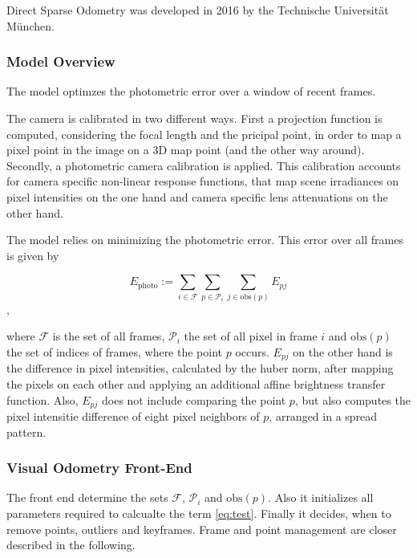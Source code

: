 	Direct Sparse Odometry was developed in 2016 by the Technische Universität München. %
	
	\subsubsection{Model Overview}\label{samemodel}
	
	The model optimzes the photometric error over a window of recent frames. 
	
	The camera is calibrated in two different ways. First a projection function is computed, considering the focal length and the pricipal point, 
	in order to map a pixel point in the image on a 3D map point (and the other way around). Secondly, a photometric camera calibration is applied. 
	This calibration accounts for camera specific non-linear response functions, that map scene irradiances on pixel intensities on the one hand and 
	camera specific lens attenuations on the other hand. 
	
	The model relies on minimizing the photometric error. This error over all frames is given by
	
	$$E_{\text{photo}}:= \sum_{i \in \mathcal{F}} \sum_{p \in \mathcal{P}_i} \sum_{j \in \text{obs}\left(p\right)} E_{pj}$$,
	
	where $\mathcal{F}$ is the set of all frames, $\mathcal{P}_i$ the set of all pixel in frame $i$ and $\text{obs}\left(p\right)$
	the set of indices of frames, where the point $p$ occurs. $E_{pj}$ on the other hand is the difference in pixel intensities, calculated 
	by the huber norm, after mapping the pixels on each other and applying an additional affine brightness transfer function. Also, $E_{pj}$ does not 
	include comparing the point $p$, but also computes the pixel intensitie difference of eight pixel neighbors of $p$, arranged in a spread pattern. 
	
	
	\subsubsection{Visual Odometry Front-End}
	
	The front end determine the sets $\mathcal{F}$, $\mathcal{P}_i$ and $\text{obs}\left(p\right)$. Also it initializes all parameters required to calcualte the term \ref{eq:test}. 
	Finally it decides, when to remove points, outliers and keyframes. Frame and point management are closer described in the following. 
	
